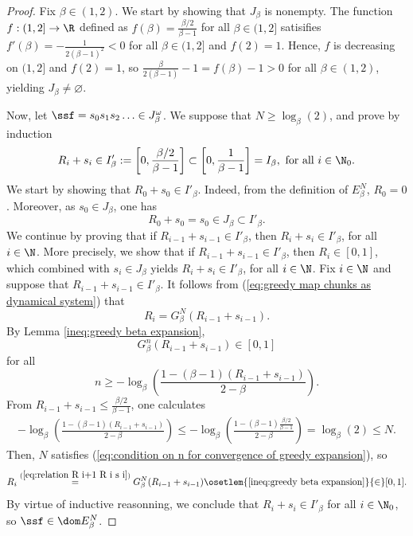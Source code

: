 \begin{proof}
	Fix $\beta \in (1,2)$. We start by showing that $J_\beta$ is nonempty.
	The function $f : (1,2] \to \R$ defined as $f(\beta) = \frac{\beta/2}{\beta-1}$ for all $\beta \in (1,2]$ satisifies $f'(\beta) = -\frac{1}{2(\beta-1)^2} < 0$ for all $\beta \in (1,2]$ and $f(2) = 1$. Hence, $f$ is decreasing on $(1,2]$ and $f(2) = 1$, so $ \frac{\beta}{2(\beta - 1)} - 1 = f(\beta) - 1 > 0$ for all $\beta \in (1,2)$, yielding $J_\beta \neq \varnothing$.

	Now, let $\ssf = s_0s_1s_2\ldots \in J_\beta^\omega$. We suppose that $N \geq \log_\beta(2)$, and prove by induction
	\begin{equation}\label{eq:condition Ri si}
		R_i + s_i \in I'_\beta := \left[0, \frac{\beta/2}{\beta-1}\right] \subset \left[0, \frac{1}{\beta-1}\right] = I_\beta, \ \text{for all}\ i \in \N_0.
	\end{equation}
	We start by showing that $R_0 + s_0 \in I'_\beta$. Indeed, from the definition of $E_\beta^N$, $R_0 = 0$. Moreover, as $s_0 \in J_\beta$, one has
	\begin{equation}
		R_0 + s_0 = s_0 \in J_\beta \subset I'_\beta.
	\end{equation}
	We continue by proving that if $R_{i-1} + s_{i-1} \in I'_\beta$, then $R_{i} + s_i \in I'_\beta$, for all $i \in \N$. More precisely, we show that if $R_{i-1} + s_{i-1} \in I'_\beta$, then $R_i \in [0,1]$, which combined with $s_i \in J_\beta$ yields $R_i + s_i \in I'_\beta$, for all $i \in \N$. Fix $i \in \N$ and suppose that $R_{i-1} + s_{i-1}\in I'_\beta$. It follows from (\ref{eq:greedy map chunks as dynamical system}) that
	\begin{equation}\label{eq:relation R i+1 R i s i}
		R_i = G_\beta^N\left(R_{i-1}+s_{i-1}\right).
	\end{equation}
	By Lemma \ref{ineq:greedy beta expansion}, 
	\begin{equation}
		G_\beta^n\left(R_{i-1} + s_{i-1}\right) \in [0,1]
	\end{equation}
	for all
	\begin{equation}\label{eq:condition on n for convergence of greedy expansion}
		n \geq - \log_\beta\left( \frac{1 - (\beta - 1)(R_{i-1} + s_{i-1})}{2- \beta} \right).
	\end{equation}
	From $R_{i-1} + s_{i-1} \leq \frac{\beta/2}{\beta-1}$, one calculates
	\begin{align}
		- \log_\beta\left( \frac{1 - (\beta - 1)(R_{i-1}+s_{i-1})}{2- \beta} \right) \leq - \log_\beta\left( \frac{1 - (\beta - 1)\frac{\beta/2}{\beta-1}}{2- \beta} \right)
		 = \log_\beta(2)
		 \leq N.
	\end{align}
	Then, $N$ satisfies (\ref{eq:condition on n for convergence of greedy expansion}), so
	\begin{equation}\label{eq:R i is in 0 1}
		R_{i} \overset{(\ref{eq:relation R i+1 R i s i})}{=} G^N_\beta(R_{i-1} + s_{i-1}) \osetlem{\ref{ineq:greedy beta expansion}}{\in} [0,1].
	\end{equation}
	By virtue of inductive reasonning, we conclude that $R_i + s_i \in I'_\beta$ for all $i \in \N_0$, so $\ssf \in \dom E_\beta^N$.
\end{proof}

